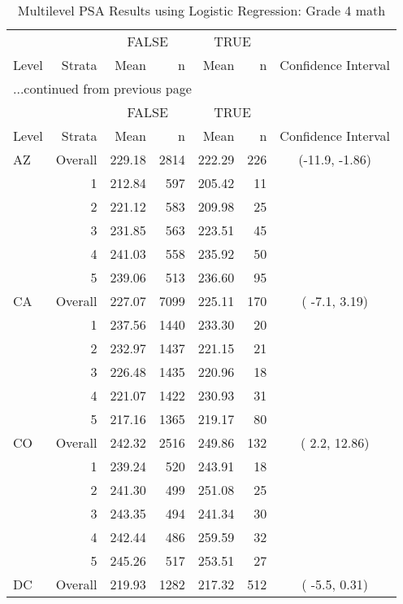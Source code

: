 \begin{longtable}{lrrr@{\extracolsep{.25cm}}rrc}
\caption{Multilevel PSA Results using Logistic Regression: Grade 4 math} \\ 
   \hline & & \multicolumn{2}{c}{FALSE} & \multicolumn{2}{c}{TRUE} & \\ \cline{3-4} \cline{5-6} Level & Strata & Mean & n & Mean & n & Confidence Interval \\ \hline\endfirsthead \multicolumn{7}{l}{{...continued from previous page}}\\ \hline  & & \multicolumn{2}{c}{FALSE} & \multicolumn{2}{c}{TRUE} & \\ \cline{3-4} \cline{5-6} Level & Strata & Mean & n & Mean & n & Confidence Interval \\ \hline \endhead \endfoot \endlastfoot  \hline
AZ & Overall & 229.18 & 2814 & 222.29 & 226 & (-11.9,  -1.86) \\ 
   & 1 & 212.84 & 597 & 205.42 &  11 &  \\ 
   & 2 & 221.12 & 583 & 209.98 &  25 &  \\ 
   & 3 & 231.85 & 563 & 223.51 &  45 &  \\ 
   & 4 & 241.03 & 558 & 235.92 &  50 &  \\ 
   & 5 & 239.06 & 513 & 236.60 &  95 &  \\ 
   \hline
CA & Overall & 227.07 & 7099 & 225.11 & 170 & ( -7.1,   3.19) \\ 
   & 1 & 237.56 & 1440 & 233.30 &  20 &  \\ 
   & 2 & 232.97 & 1437 & 221.15 &  21 &  \\ 
   & 3 & 226.48 & 1435 & 220.96 &  18 &  \\ 
   & 4 & 221.07 & 1422 & 230.93 &  31 &  \\ 
   & 5 & 217.16 & 1365 & 219.17 &  80 &  \\ 
   \hline
CO & Overall & 242.32 & 2516 & 249.86 & 132 & (  2.2,  12.86) \\ 
   & 1 & 239.24 & 520 & 243.91 &  18 &  \\ 
   & 2 & 241.30 & 499 & 251.08 &  25 &  \\ 
   & 3 & 243.35 & 494 & 241.34 &  30 &  \\ 
   & 4 & 242.44 & 486 & 259.59 &  32 &  \\ 
   & 5 & 245.26 & 517 & 253.51 &  27 &  \\ 
   \hline
DC & Overall & 219.93 & 1282 & 217.32 & 512 & ( -5.5,   0.31) \\ 

\end{longtable}
